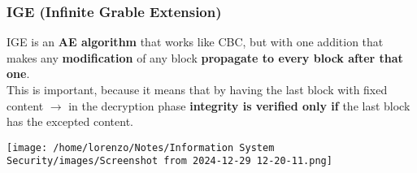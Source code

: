 \begin{customquote}
\vspace{-0.4cm}
\subsubsection{IGE (Infinite Grable Extension)}
\begin{minipage}{0.5\textwidth}
	\vspace{-0.5cm}
IGE is an \textbf{AE algorithm} that works like
CBC, but with one addition that makes
any \textbf{modification} of any block \textbf{propagate
to every block after that one}.\\
This is important, because it means that
by having the last block with fixed content
\(\rightarrow \) in the decryption phase \textbf{integrity is verified only if} the last block has the excepted content. 
\end{minipage} 
\hspace{0cm}
\begin{minipage}{0.4\textwidth}
    \centering
    \texttt{[image: /home/lorenzo/Notes/Information System Security/images/Screenshot from 2024-12-29 12-20-11.png]}
\end{minipage}

\end{customquote}


